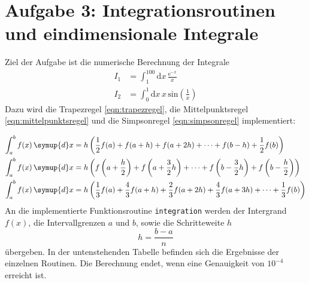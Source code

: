 \section*{Aufgabe 3: Integrationsroutinen und eindimensionale Integrale}
Ziel der Aufgabe ist die numerische Berechnung der Integrale
\begin{align}
	I_1 &= \int_1^{100} \text{d} x \,\frac{\text{e}^{-x}}{x} \\
	I_2 &= \int_0^1 \text{d} x \, x \, \text{sin}\left(\frac{1}{x}\right)
\end{align}
\noindent
Dazu wird die Trapezregel \eqref{eqn:trapezregel}, die Mittelpunktsregel \eqref{eqn:mittelpunktsregel} und die Simpsonregel \eqref{eqn:simpsonregel} implementiert:
\begin{small}
\begin{align}
	\label{eqn:trapezregel}
	\int_a^b  f(x)\, \symup{d} x &= h \left(\frac{1}{2}f(a) + f(a + h) + f(a + 2h) + \dots + f(b - h) + \frac{1}{2}f(b)\right) \\
	\label{eqn:mittelpunktsregel}
	\int_a^b  f(x)\, \symup{d} x &= h \left(f\left(a + \frac{h}{2}\right) + f\left(a + \frac{3}{2} h\right) + \dots + f\left(b - \frac{3}{2} h \right) + f\left(b - \frac{h}{2}\right)\right) \\
	\label{eqn:simpsonregel}
	\int_a^b f(x) \,\symup{d} x &= h \left(\frac{1}{3}f(a) + \frac{4}{3}f(a + h) + \frac{2}{3} f(a + 2h) + \frac{4}{3}f(a + 3h) + \dots +  \frac{1}{3}f(b)\right)
\end{align}
\noindent
An die implementierte Funktionsroutine \texttt{integration} werden der Intergrand $f(x)$, die Intervallgrenzen $a$ und $b$, sowie die Schritteweite $h$
\begin{equation*}
	h = \frac{b - a}{n}
\end{equation*}
\noindent
übergeben.
In der untenstehenden Tabelle befinden sich die Ergebnisse der einzelnen Routinen.
Die Berechnung endet, wenn eine Genauigkeit von $10^{-4}$ erreicht ist.
\end{small}
\FloatBarrier
\begin{table}[h]
    \centering
		\label{tab:tab1}
		\caption{Ergebnisse der verschiedenen Integrationsmethoden}
\end{table}
\FloatBarrier


